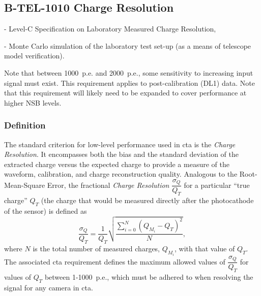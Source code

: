 \begin{requirement}{\subsection{B-TEL-1010 Charge Resolution}}
\begin{itemize}
- Level-C Specification on Laboratory Measured Charge Resolution,

- Monte Carlo simulation of the laboratory test set-up (as a means of telescope model verification).

Note that between 1000~p.e. and 2000~p.e., some sensitivity to increasing input signal must exist. \newline
This requirement applies to post-calibration (DL1) data. \newline
Note that this requirement will likely need to be expanded to cover performance at higher NSB levels.
\end{itemize}
\end{requirement}

\subsubsection{Definition}
The standard criterion for low-level performance used in \gls{cta} is the \textit{Charge Resolution}. It encompasses both the bias and the standard deviation of the extracted charge versus the expected charge to provide a measure of the waveform, calibration, and charge reconstruction quality. Analogous to the Root-Mean-Square Error, the fractional \textit{Charge Resolution} $\dfrac{\sigma_Q}{Q_T}$ for a particular ``true charge'' $Q_T$ (the charge that would be measured directly after the photocathode of the sensor) is defined as
\begin{equation} \label{eq:charge_res}
\dfrac{\sigma_Q}{Q_T} = \dfrac{1}{Q_T} \sqrt{\dfrac{\sum_{i=0}^N (Q_{M_i} - Q_T)^2}{N}},
\end{equation}
where $N$ is the total number of measured charges, $Q_{M_i}$, with that value of $Q_T$. The associated \gls{cta} requirement defines the maximum allowed values of $\dfrac{\sigma_Q}{Q_T}$ for values of $Q_T$ between 1-1000~p.e., which must be adhered to when resolving the signal for any camera in \gls{cta}.

